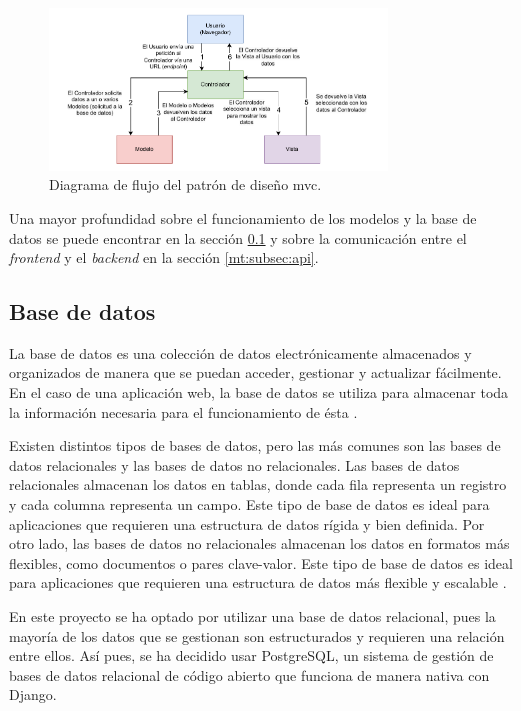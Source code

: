 \begin{figure}
    \centering
    \includegraphics[width=0.8\textwidth]{figures/theoric_frame/mvc.pdf}
    \caption{Diagrama de flujo del patrón de diseño \gls{mvc}.}
    \label{fig:mvc}
\end{figure}

Una mayor profundidad sobre el funcionamiento de los modelos y la base de datos se puede encontrar en la sección \ref{mt:subsec:base_datos} y sobre la comunicación entre el \textit{frontend} y el \textit{backend} en la sección \ref{mt:subsec:api}.

\subsection{Base de datos}
\label{mt:subsec:base_datos}

La base de datos es una colección de datos electrónicamente almacenados y organizados de manera que se puedan acceder, gestionar y actualizar fácilmente. En el caso de una aplicación web, la base de datos se utiliza para almacenar toda la información necesaria para el funcionamiento de ésta \cite{aws_database}.

Existen distintos tipos de bases de datos, pero las más comunes son las bases de datos relacionales y las bases de datos no relacionales. Las bases de datos relacionales almacenan los datos en tablas, donde cada fila representa un registro y cada columna representa un campo. Este tipo de base de datos es ideal para aplicaciones que requieren una estructura de datos rígida y bien definida. Por otro lado, las bases de datos no relacionales almacenan los datos en formatos más flexibles, como documentos o pares clave-valor. Este tipo de base de datos es ideal para aplicaciones que requieren una estructura de datos más flexible y escalable \cite{aws_database_rel}.

En este proyecto se ha optado por utilizar una base de datos relacional, pues la mayoría de los datos que se gestionan son estructurados y requieren una relación entre ellos. Así pues, se ha decidido usar PostgreSQL, un sistema de gestión de bases de datos relacional de código abierto que funciona de manera nativa con Django.

